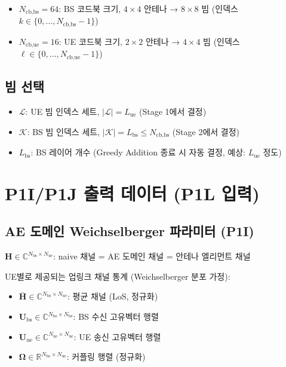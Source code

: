 \documentclass[10pt]{article}
\begin{document}
\begin{itemize}
    \item $N_{\text{cb,bs}} = 64$: BS 코드북 크기, $4 \times 4$ 안테나 → $8 \times 8$ 빔 (인덱스 $k \in \{0, \ldots, N_{\text{cb,bs}}-1\}$)
    \item $N_{\text{cb,ue}} = 16$: UE 코드북 크기, $2 \times 2$ 안테나 → $4 \times 4$ 빔 (인덱스 $\ell \in \{0, \ldots, N_{\text{cb,ue}}-1\}$)
\end{itemize}

\subsection{빔 선택}
\begin{itemize}
    \item $\mathcal{L}$: UE 빔 인덱스 세트, $|\mathcal{L}| = L_{\text{ue}}$ (Stage 1에서 결정)
    \item $\mathcal{K}$: BS 빔 인덱스 세트, $|\mathcal{K}| = L_{\text{bs}} \leq N_{\text{cb,bs}}$ (Stage 2에서 결정)
    \item $L_{\text{bs}}$: BS 레이어 개수 (Greedy Addition 종료 시 자동 결정, 예상: $L_{\text{ue}}$ 정도)
\end{itemize}

\section{P1I/P1J 출력 데이터 (P1L 입력)}

\subsection{AE 도메인 Weichselberger 파라미터 (P1I)}

$\mathbf{H} \in \mathbb{C}^{N_{\text{bs}} \times N_{\text{ue}}}$: naive 채널 = AE 도메인 채널 = 안테나 엘리먼트 채널

UE별로 제공되는 업링크 채널 통계 (Weichselberger 분포 가정):
\begin{itemize}
    \item $\bar{\mathbf{H}} \in \mathbb{C}^{N_{\text{bs}} \times N_{\text{ue}}}$: 평균 채널 (LoS, 정규화)
    \item $\mathbf{U}_{\text{bs}} \in \mathbb{C}^{N_{\text{bs}} \times N_{\text{bs}}}$: BS 수신 고유벡터 행렬
    \item $\mathbf{U}_{\text{ue}} \in \mathbb{C}^{N_{\text{ue}} \times N_{\text{ue}}}$: UE 송신 고유벡터 행렬
    \item $\boldsymbol{\Omega} \in \mathbb{R}^{N_{\text{bs}} \times N_{\text{ue}}}$: 커플링 행렬 (정규화)
\end{itemize}
\end{document}
